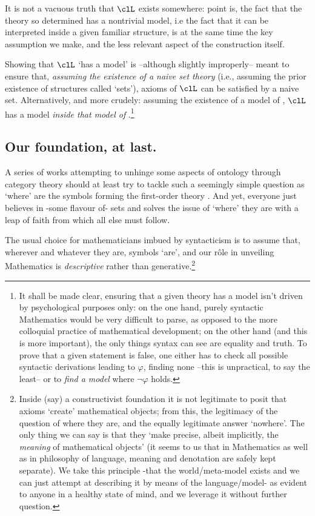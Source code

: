It is not a vacuous truth that $\clL$ exists somewhere: point is, the fact that the theory so determined has a nontrivial model, i.e the fact that it can be interpreted inside a given familiar structure, is at the same time the key assumption we make, and the less relevant aspect of the construction itself.

Showing that $\clL$ `has a model' is --although slightly improperly-- meant to ensure that, \emph{assuming the existence of a naive set theory} (i.e., assuming the prior existence of structures called `sets'), axioms of $\clL$ can be satisfied by a naive set. Alternatively, and more crudely: assuming the existence of a model of , $\clL$ has a model \emph{inside that model of }.\footnote{It shall be made clear, ensuring that a given theory has a model isn't driven by psychological purposes only: on the one hand, purely syntactic Mathematics would be very difficult to parse, as opposed to the more colloquial practice of mathematical development; on the other hand (and this is more important), the only things syntax can see are equality and truth. To prove that a given statement is false, one either has to check all possible syntactic derivations leading to $\varphi$, finding none --this is unpractical, to say the least-- or to \emph{find a model} where $\lnot\varphi$ holds.}

\subsection{Our foundation, at last.} A series of works attempting to unhinge some aspects of ontology through category theory should at least try to tackle such a seemingly simple question as `where' are the symbols forming the first-order theory . And yet, everyone just believes in -some flavour of- sets and solves the issue of `where' they are with a leap of faith from which all else must follow.



The usual choice for mathematicians imbued by syntacticism is to assume that, wherever and whatever they are, symbols `are', and our r\^ole in unveiling Mathematics is \emph{descriptive} rather than generative.\footnote{Inside (say) a constructivist foundation it is not legitimate to posit that axioms `create' mathematical objects; from this, the legitimacy of the question of where they are, and the equally legitimate answer `nowhere'. The only thing we can say is that they `make precise, albeit implicitly, the \emph{meaning} of mathematical objects' \cite{Agzz} (it seems to us that in Mathematics as well as in philosophy of language, meaning and denotation are safely kept separate). We take this principle -that the world/meta\hyp{}model exists and we can just attempt at describing it by means of the language/model- as evident to anyone in a healthy state of mind, and we leverage it without further question.}

